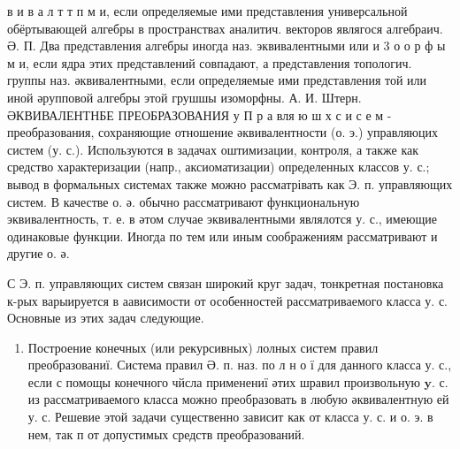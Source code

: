 \documentclass[10pt]{article}
\begin{document}
в и в а л т т п м и, если определяемые ими представления универсальной обёртывающей алгебры в пространствах аналитич. векторов являгося алгебраич. Ә. П. Два представления алгебры иногда наз. эквивалентными или и 3 о о р ф ы м и, если ядра этих представлений совпадают, а представления топологич. группы наз. әквивалентными, если определяемые ими представления той или иной әрупповой алгебры этой грушшы изоморфны. А. И. Штерн. ӘКВИВАЛЕНТНБЕ ПРЕОБРАЗОВАНИЯ $у$ П р а вля ю ш х с и с е м - преобразования, сохраняющие отношение әквивалентности (о. э.) управляюцих систем (у. с.). Используются в задачах оштимизации, контроля, а также как средство характеризации (напр., аксиоматизации) определенных классов у. с.; вывод в формальных системах также можно рассматрівать как Э. п. управляющих систем. В качестве о. ә. обычно рассматривают функциональную эквивалентность, т. е. в әтом случае эквивалентными являлотся у. с., имеющие одинаковые функции. Иногда по тем или иным соображениям рассматривают и другие о. ә.



С Э. п. управляющих систем связан широкий круг задач, тонкретная постановка к-рых варыируется в аависимости от особенностей рассматриваемого класса у. с. Основные из этих задач следующие.



\begin{enumerate}

  \item Построение конечных (или рекурсивных) лолных систем правил преобразованиї. Система правил Ә. п. наз. по л н о ї для данного класса у. с., если с помощы конечного чйсла применениї әтих шравил произвольную $\boldsymbol{y}$. с. из рассматриваемого класса можно преобразовать в любую әквивалентную ей у. с. Решевие этой задачи существенно зависит как от класса у. с. и о. э. в нем, так п от допустимых средств преобразований.

\end{enumerate}
\end{document}

